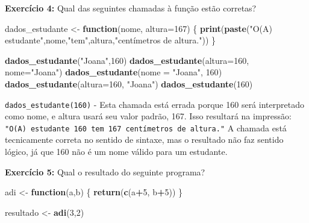 \documentclass[
]{book}
\newenvironment{Shaded}{\begin{snugshade}}{\end{snugshade}}
\newcommand{\AttributeTok}[1]{\textcolor[rgb]{0.13,0.29,0.53}{#1}}
\newcommand{\ControlFlowTok}[1]{\textcolor[rgb]{0.13,0.29,0.53}{\textbf{#1}}}
\newcommand{\DecValTok}[1]{\textcolor[rgb]{0.00,0.00,0.81}{#1}}
\newcommand{\FunctionTok}[1]{\textcolor[rgb]{0.13,0.29,0.53}{\textbf{#1}}}
\newcommand{\NormalTok}[1]{#1}
\newcommand{\OtherTok}[1]{\textcolor[rgb]{0.56,0.35,0.01}{#1}}
\newcommand{\SpecialCharTok}[1]{\textcolor[rgb]{0.81,0.36,0.00}{\textbf{#1}}}
\newcommand{\StringTok}[1]{\textcolor[rgb]{0.31,0.60,0.02}{#1}}
\begin{document}
\textbf{Exercício 4:} Qual das seguintes chamadas à função estão corretas?

\begin{Shaded}
\begin{Highlighting}[]
\NormalTok{dados\_estudante }\OtherTok{\textless{}{-}} \ControlFlowTok{function}\NormalTok{(nome, }\AttributeTok{altura=}\DecValTok{167}\NormalTok{) \{}
  \FunctionTok{print}\NormalTok{(}\FunctionTok{paste}\NormalTok{(}\StringTok{"O(A) estudante"}\NormalTok{,nome,}\StringTok{"tem"}\NormalTok{,altura,}\StringTok{"centímetros de altura."}\NormalTok{))}
\NormalTok{\}}

\FunctionTok{dados\_estudante}\NormalTok{(}\StringTok{"Joana"}\NormalTok{,}\DecValTok{160}\NormalTok{)}
\FunctionTok{dados\_estudante}\NormalTok{(}\AttributeTok{altura=}\DecValTok{160}\NormalTok{, }\AttributeTok{nome=}\StringTok{"Joana"}\NormalTok{)}
\FunctionTok{dados\_estudante}\NormalTok{(}\AttributeTok{nome =} \StringTok{"Joana"}\NormalTok{, }\DecValTok{160}\NormalTok{)}
\FunctionTok{dados\_estudante}\NormalTok{(}\AttributeTok{altura=}\DecValTok{160}\NormalTok{, }\StringTok{"Joana"}\NormalTok{)}
\FunctionTok{dados\_estudante}\NormalTok{(}\DecValTok{160}\NormalTok{)}
\end{Highlighting}
\end{Shaded}

\texttt{dados\_estudante(160)} - Esta chamada está errada porque 160 será
interpretado como nome, e altura usará seu valor padrão, 167. Isso
resultará na impressão:
\texttt{"O(A)\ estudante\ 160\ tem\ 167\ centímetros\ de\ altura."} A chamada está
tecnicamente correta no sentido de sintaxe, mas o resultado não faz
sentido lógico, já que 160 não é um nome válido para um estudante.

\textbf{Exercício 5:} Qual o resultado do seguinte programa?

\begin{Shaded}
\begin{Highlighting}[]
\NormalTok{adi }\OtherTok{\textless{}{-}} \ControlFlowTok{function}\NormalTok{(a,b) \{  }
  \FunctionTok{return}\NormalTok{(}\FunctionTok{c}\NormalTok{(a}\SpecialCharTok{+}\DecValTok{5}\NormalTok{, b}\SpecialCharTok{+}\DecValTok{5}\NormalTok{))}
\NormalTok{\}}

\NormalTok{resultado }\OtherTok{\textless{}{-}} \FunctionTok{adi}\NormalTok{(}\DecValTok{3}\NormalTok{,}\DecValTok{2}\NormalTok{)}
\end{Highlighting}
\end{Shaded}
\end{document}
